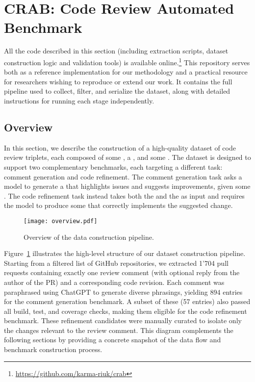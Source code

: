 \section{CRAB: Code Review Automated Benchmark}

All the code described in this section (including extraction scripts, dataset construction logic and
validation tools) is available online.\footnote{\url{https://github.com/karma-riuk/crab}} This
repository serves both as a reference implementation for our methodology and a practical resource
for researchers wishing to reproduce or extend our work. It contains the full pipeline used to
collect, filter, and serialize the dataset, along with detailed instructions for running each stage
independently.

\subsection{Overview}

In this section, we describe the construction of a high-quality dataset of code review triplets,
each composed of some \subCode, a \revComment, and some \revCode. The dataset is designed to support
two complementary benchmarks, each targeting a different task: comment generation and code
refinement. The comment generation task asks a model to generate a \revComment that highlights
issues and suggests improvements, given some \subCode. The code refinement task instead takes both
the \subCode and the \revComment as input and requires the model to produce some \revCode that
correctly implements the suggested change.

\begin{figure}[!htbp]
	\centering
	\texttt{[image: overview.pdf]}
	\caption{Overview of the data construction pipeline.}
	\label{fig:overview}
\end{figure}

Figure~\ref{fig:overview} illustrates the high-level structure of our dataset construction pipeline.
Starting from a filtered list of GitHub repositories, we extracted 1'704 pull requests containing
exactly one review comment (with optional reply from the author of the PR) and a corresponding code
revision. Each comment was paraphrased using ChatGPT to generate diverse phrasings, yielding 894
entries for the comment generation benchmark. A subset of these (57 entries) also passed all build,
test, and coverage checks, making them eligible for the code refinement benchmark. These refinement
candidates were manually curated to isolate only the changes relevant to the review comment. This
diagram complements the following sections by providing a concrete snapshot of the data flow and
benchmark construction process.

